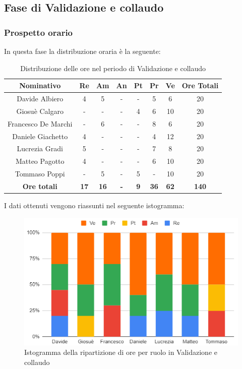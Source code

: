\subsection{Fase di Validazione e collaudo}
\subsubsection{Prospetto orario}
In questa fase la distribuzione oraria è la seguente:
\begin{table}[H]
		\begin{center}
			\setlength{\aboverulesep}{0pt}
			\setlength{\belowrulesep}{0pt}
			\setlength{\extrarowheight}{.75ex}
			\begin{tabular}{ c c c c c c c c }
				\rowcolor{AzzurroGruppo!30} 
				\textbf{Nominativo} & \textbf{Re} & \textbf{Am} & \textbf{An} & \textbf{Pt} & \textbf{Pr} & \textbf{Ve} & \textbf{Ore Totali}  \\
				\toprule
				Davide Albiero       & 4 & 5 & - & - & 5 & 6 & 20 \\
				Giosuè Calgaro      & - & - & - & 4 & 6 & 10 & 20 \\
				Francesco De Marchi & - & 6 & - & - & 8 & 6 & 20\\
				Daniele Giachetto  & 4 & - & - & - & 4 & 12 & 20\\
				Lucrezia Gradi      & 5 & - & - & - & 7 & 8 & 20\\
				Matteo Pagotto      & 4 & - & - & - & 6 & 10 & 20\\
				Tommaso Poppi       & - & 5 & - & 5 & - & 10 & 20\\
				 \textbf{Ore totali} & \textbf{17} & \textbf{16} & \textbf{-} & \textbf{9} & \textbf{36} & \textbf{62} & \textbf{140} \\
				\bottomrule
			\end{tabular}
			\caption{Distribuzione delle ore nel periodo di Validazione e collaudo}
		\end{center}
	\end{table}
	I dati ottenuti vengono riassunti nel seguente istogramma:
	\begin{figure}[H]
    \centering
    \includegraphics[scale = 0.5]{components/img/validazione_isto.png}
    \caption{Istogramma della ripartizione di ore per ruolo in Validazione e collaudo}
    \label{fig:istogramma ripartizione ore , fase di Validazione e Collaudo}
\end{figure}
